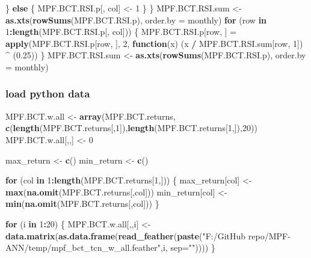 \documentclass[
]{article}
\newenvironment{Shaded}{\begin{snugshade}}{\end{snugshade}}
\newcommand{\ControlFlowTok}[1]{\textcolor[rgb]{0.13,0.29,0.53}{\textbf{#1}}}
\newcommand{\DataTypeTok}[1]{\textcolor[rgb]{0.13,0.29,0.53}{#1}}
\newcommand{\DecValTok}[1]{\textcolor[rgb]{0.00,0.00,0.81}{#1}}
\newcommand{\FloatTok}[1]{\textcolor[rgb]{0.00,0.00,0.81}{#1}}
\newcommand{\KeywordTok}[1]{\textcolor[rgb]{0.13,0.29,0.53}{\textbf{#1}}}
\newcommand{\NormalTok}[1]{#1}
\newcommand{\OperatorTok}[1]{\textcolor[rgb]{0.81,0.36,0.00}{\textbf{#1}}}
\newcommand{\StringTok}[1]{\textcolor[rgb]{0.31,0.60,0.02}{#1}}
\begin{document}
\begin{Shaded}
\begin{Highlighting}[]
\NormalTok{  \} }\ControlFlowTok{else}\NormalTok{ \{}
\NormalTok{    MPF.BCT.RSI.p[, col] <-}\StringTok{ }\DecValTok{1}
\NormalTok{  \}}
\NormalTok{\}}
\NormalTok{MPF.BCT.RSI.sum <-}
\StringTok{  }\KeywordTok{as.xts}\NormalTok{(}\KeywordTok{rowSums}\NormalTok{(MPF.BCT.RSI.p), }\DataTypeTok{order.by =}\NormalTok{ monthly)}
\ControlFlowTok{for}\NormalTok{ (row }\ControlFlowTok{in} \DecValTok{1}\OperatorTok{:}\KeywordTok{length}\NormalTok{(MPF.BCT.RSI.p[, col])) \{}
\NormalTok{  MPF.BCT.RSI.p[row, ] =}\StringTok{ }\KeywordTok{apply}\NormalTok{(MPF.BCT.RSI.p[row, ], }\DecValTok{2}\NormalTok{, }\ControlFlowTok{function}\NormalTok{(x)}
\NormalTok{    (x }\OperatorTok{/}\StringTok{ }\NormalTok{MPF.BCT.RSI.sum[row, }\DecValTok{1}\NormalTok{]) }\OperatorTok{^}\StringTok{ }\NormalTok{(}\FloatTok{0.25}\NormalTok{))}
\NormalTok{\}}
\NormalTok{MPF.BCT.RSI.sum <-}
\StringTok{  }\KeywordTok{as.xts}\NormalTok{(}\KeywordTok{rowSums}\NormalTok{(MPF.BCT.RSI.p), }\DataTypeTok{order.by =}\NormalTok{ monthly)}
\end{Highlighting}
\end{Shaded}

\hypertarget{load-python-data}{%
\subsubsection{load python data}\label{load-python-data}}

\begin{Shaded}
\begin{Highlighting}[]
\NormalTok{MPF.BCT.w.all <-}\StringTok{ }\KeywordTok{array}\NormalTok{(MPF.BCT.returns,}
                        \KeywordTok{c}\NormalTok{(}\KeywordTok{length}\NormalTok{(MPF.BCT.returns[,}\DecValTok{1}\NormalTok{]),}\KeywordTok{length}\NormalTok{(MPF.BCT.returns[}\DecValTok{1}\NormalTok{,]),}\DecValTok{20}\NormalTok{))}
\NormalTok{MPF.BCT.w.all[,,] <-}\StringTok{ }\DecValTok{0}

\NormalTok{max_return <-}\StringTok{ }\KeywordTok{c}\NormalTok{()}
\NormalTok{min_return <-}\StringTok{ }\KeywordTok{c}\NormalTok{()}

\ControlFlowTok{for}\NormalTok{ (col }\ControlFlowTok{in} \DecValTok{1}\OperatorTok{:}\KeywordTok{length}\NormalTok{(MPF.BCT.returns[}\DecValTok{1}\NormalTok{,])) \{}
\NormalTok{  max_return[col] <-}\StringTok{ }\KeywordTok{max}\NormalTok{(}\KeywordTok{na.omit}\NormalTok{(MPF.BCT.returns[,col]))}
\NormalTok{  min_return[col] <-}\StringTok{ }\KeywordTok{min}\NormalTok{(}\KeywordTok{na.omit}\NormalTok{(MPF.BCT.returns[,col]))}
\NormalTok{\}}

\ControlFlowTok{for}\NormalTok{ (i }\ControlFlowTok{in} \DecValTok{1}\OperatorTok{:}\DecValTok{20}\NormalTok{) \{}
\NormalTok{  MPF.BCT.w.all[,,i] <-}\StringTok{ }\KeywordTok{data.matrix}\NormalTok{(}\KeywordTok{as.data.frame}\NormalTok{(}\KeywordTok{read_feather}\NormalTok{(}\KeywordTok{paste}\NormalTok{(}\StringTok{"F:/GitHub repo/MPF-ANN/temp/mpf_bct_tcn_w_all.feather"}\NormalTok{,i, }\DataTypeTok{sep=}\StringTok{""}\NormalTok{))))}
\NormalTok{\}}
\end{Highlighting}
\end{Shaded}
\end{document}
